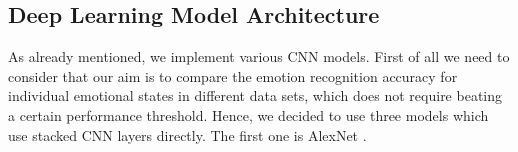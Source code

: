 \documentclass[a4paper, conference]{IEEEtran}
\begin{document}
\subsection{Deep Learning Model Architecture}
As already mentioned, we implement various CNN models. First of all we need to consider that our aim is to compare the emotion recognition accuracy for individual emotional states in different data sets, which does not require beating a certain performance threshold. Hence, we decided to use three models which use stacked CNN layers directly. The first one is AlexNet \cite{krizhevskyImagenetClassificationDeep2012}. %
%
\end{document}
